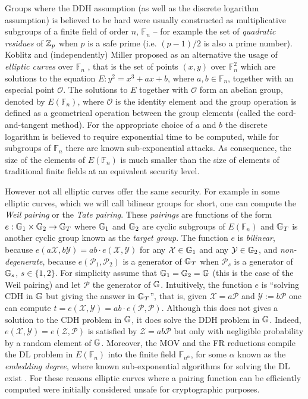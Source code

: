Groups where the DDH assumption (as well as the discrete logarithm assumption) is believed to be hard were usually constructed as multiplicative subgroups of a finite field of order $n$, $\mathbb{F}_n$ -- for example the set of \emph{quadratic residues} of $\mathbb{Z}_p$ when $p$ is a safe prime (i.e. $(p-1)/2$ is also a prime number).
Koblitz and (independently) Miller proposed as an alternative the usage of \emph{elliptic curves} over $\mathbb{F}_n$ \cite{MOC:Koblitz87,C:Miller85}, that is the set of points $(x,y)$ over $\mathbb{F}_n^2$ which are solutions to the equation $E:y^2=x^3+ax+b$, where $a,b\in\mathbb{F}_n$, together with an especial point $\mathcal{O}$. The solutions to $E$ together with $\mathcal{O}$ form an abelian group, denoted by $E(\mathbb{F}_n)$, where $\mathcal{O}$ is the identity element and the group operation is defined as a geometrical operation between the group elements (called the cord-and-tangent method). For the appropriate choice of $a$ and $b$ the discrete logarithm is believed to require exponential time to be computed, while for subgroups of $\mathbb{F}_n$  there are known sub-exponential attacks. As consequence, the size of the elements of $E(\mathbb{F}_n)$ is much smaller than the size of elements of traditional finite fields at an equivalent security level.

However not all elliptic curves offer the same security. For example in some elliptic curves, which we will call bilinear groups for short, one can compute the \emph{Weil pairing} or the \emph{Tate pairing}. These \emph{pairings} are functions of the form $e:\mathbb{G}_1\times\mathbb{G}_2\to\mathbb{G}_T$ where $\mathbb{G}_1$ and $\mathbb{G}_2$ are cyclic subgroups of $E(\mathbb{F}_n)$ and $\mathbb{G}_T$ is another cyclic group known as the \emph{target group}. The function $e$ is \emph{bilinear}, because $e(a\mathcal{X},b\mathcal{Y})=ab\cdot e(\mathcal{X},\mathcal{Y})$ for any $\mathcal{X}\in\mathbb{G}_1$ and any $\mathcal{Y}\in\mathbb{G}_2$, and \emph{non-degenerate}, because $e(\mathcal{P}_1,\mathcal{P}_2)$ is a generator of $\mathbb{G}_T$ when $\mathcal{P}_s$ is a generator of $\mathbb{G}_s$, $s\in\{1,2\}$. For simplicity assume that $\mathbb{G}_1=\mathbb{G}_2=\mathbb{G}$ (this is the case of the Weil pairing) and let $\mathcal{P}$ the generator of $\mathbb{G}$. Intuitively, the function $e$ is ``solving CDH in $\mathbb{G}$ but giving the answer in $\mathbb{G}_T$'', that is, given $\mathcal{X}=a\mathcal{P}$ and $\mathcal{Y}:=b\mathcal{P}$ one can compute $t=e(\mathcal{X},\mathcal{Y})=ab\cdot e(\mathcal{P},\mathcal{P})$. Although this does not gives a solution to the CDH problem in $\mathbb{G}$, it does solve the DDH problem in $\mathbb{G}$. Indeed, $e(\mathcal{X},\mathcal{Y})=e(\mathcal{Z},\mathcal{P})$ is satisfied by $\mathcal{Z}=ab\mathcal{P}$ but only with negligible probability by a random element of $\mathbb{G}$. 
Moreover, the MOV and the FR reductions compile the DL problem in $E(\mathbb{F}_n)$ into the finite field $\mathbb{F}_{n^\alpha}$, for some $\alpha$ known as the \emph{embedding degree}, where known sub-exponential algorithms for solving the DL exist \cite{STOC:MenVanOka91,MOC:FreRuc94}.
For these reasons elliptic curves where a pairing function can be efficiently computed were initially considered unsafe for cryptographic purposes.

